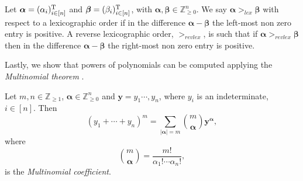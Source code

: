 \begin{definition}
Let $\bm{\alpha}=(\alpha_i)^{\textnormal{T}}_{i\in[n]}$ and $\bm{\beta}=(\beta_i)^{\textnormal{T}}_{i\in[n]}$, with $\bm{\alpha},\bm{\beta}\in\mathbb{Z}^n_{\geq 0}$. We say $\bm{\alpha}>_{lex}\bm{\beta}$ with respect to a lexicographic order if in the difference $\bm{\alpha}-\bm{\beta}$ the left-most non zero entry is positive.  A reverse lexicographic order, $>_{revlex}$, is such that if $\bm{\alpha}>_{revlex}\bm{\beta}$ then in the difference $\bm{\alpha}-\bm{\beta}$ the right-most non zero entry is positive.
\end{definition}

Lastly, we show that powers of polynomials can be computed applying the \textit{Multinomial theorem} \citep[see e.g. page 336 of][]{Cox2007a}. 

\begin{theorem}
Let $m,n\in\mathbb{Z}_{\geq 1}$, $\bm{\alpha}\in\mathbb{Z}^n_{\geq 0}$ and $\bm{y}=y_1\cdots,y_n$, where $y_i$ is an indeterminate, $i\in[n]$. Then
\[
(y_1+\cdots+y_n)^m=\sum_{|\bm{\alpha}|=m}\binom{m}{\bm{\alpha}}\bm{y}^{\bm{\alpha}},
\]
where 
\[
\binom{m}{\bm{\alpha}}=\frac{m!}{\alpha_1!\cdots \alpha_n!},
\]
is the \emph{Multinomial coefficient}.
\end{theorem}